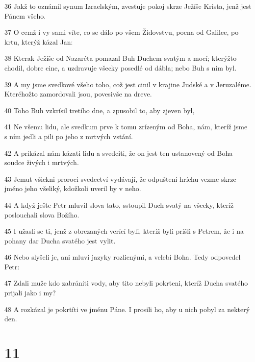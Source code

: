 \par 36 Jakž to oznámil synum Izraelským, zvestuje pokoj skrze Ježíše Krista, jenž jest Pánem všeho.
\par 37 O cemž i vy sami víte, co se dálo po všem Židovstvu, pocna od Galilee, po krtu, kterýž kázal Jan:
\par 38 Kterak Ježíše od Nazaréta pomazal Buh Duchem svatým a mocí; kterýžto chodil, dobre cine, a uzdravuje všecky posedlé od dábla; nebo Buh s ním byl.
\par 39 A my jsme svedkové všeho toho, což jest cinil v krajine Judské a v Jeruzaléme. Kteréhožto zamordovali jsou, povesivše na dreve.
\par 40 Toho Buh vzkrísil tretího dne, a zpusobil to, aby zjeven byl,
\par 41 Ne všemu lidu, ale svedkum prve k tomu zrízeným od Boha, nám, kteríž jsme s ním jedli a pili po jeho z mrtvých vstání.
\par 42 A prikázal nám kázati lidu a svedciti, že on jest ten ustanovený od Boha soudce živých i mrtvých.
\par 43 Jemut všickni proroci svedectví vydávají, že odpuštení hríchu vezme skrze jméno jeho všeliký, kdožkoli uveril by v neho.
\par 44 A když ješte Petr mluvil slova tato, sstoupil Duch svatý na všecky, kteríž poslouchali slova Božího.
\par 45 I užasli se ti, jenž z obrezaných verící byli, kteríž byli prišli s Petrem, že i na pohany dar Ducha svatého jest vylit.
\par 46 Nebo slyšeli je, ani mluví jazyky rozlicnými, a velebí Boha. Tedy odpovedel Petr:
\par 47 Zdali muže kdo zabrániti vody, aby tito nebyli pokrteni, kteríž Ducha svatého prijali jako i my?
\par 48 A rozkázal je pokrtíti ve jménu Páne. I prosili ho, aby u nich pobyl za nekterý den.

\chapter{11}

